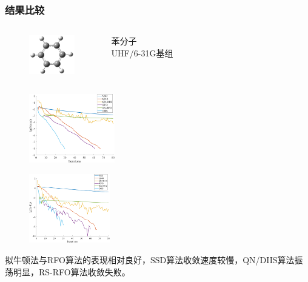\documentclass[10pt,aspectratio=43,mathserif,UTF8]{beamer}
\begin{document}
\begin{frame}
	\frametitle{结果比较}
	\begin{columns}[c]
		\begin{figure}[htbp]
			\includegraphics[height=1.7cm]{figure/benzene/benzene2.jpg}
		\end{figure}

		苯分子\\
		UHF/6-31G基组
		
	\end{columns}
	
	\begin{figure}[ht!]
		\centering
		\begin{minipage}{0.4\linewidth}
			\centering
			\includegraphics[height=3cm]{figure/benzene/NORM7.png}
			\label{fig:benzene:lognorm}
		\end{minipage}
		\begin{minipage}{0.4\linewidth}
			\centering
			\includegraphics[height=3cm]{figure/benzene/E8.png}
			\label{fig:benzene:E1}
		\end{minipage}
	\end{figure}
	拟牛顿法与RFO算法的表现相对良好，SSD算法收敛速度较慢，QN/DIIS算法振荡明显，RS-RFO算法收敛失败。
\end{frame}
\end{document}
